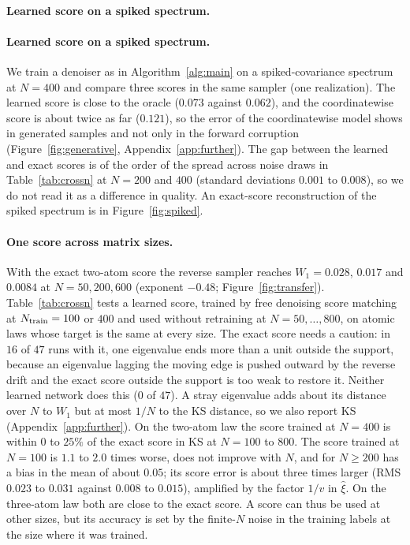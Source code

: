 \documentclass[11pt]{article}
\theoremstyle{plain}
\theoremstyle{definition}
\theoremstyle{remark}
\begin{document}
\paragraph{Learned score on a spiked spectrum.} \paragraph{Learned score on a spiked spectrum.} We train a denoiser as in Algorithm~\ref{alg:main} on a
spiked-covariance spectrum at $N=400$ and compare three scores in the same sampler
(one realization). The learned score is close to the oracle ($0.073$ against
$0.062$), and the coordinatewise score is about twice as far ($0.121$), so the error of the coordinatewise
model shows in generated samples and not only in the forward corruption (Figure~\ref{fig:generative},
Appendix~\ref{app:further}). The gap between the learned and exact scores is of the order of the spread across
noise draws in Table~\ref{tab:crossn} at $N=200$ and $400$ (standard deviations $0.001$ to $0.008$), so we do not
read it as a difference in quality. An exact-score reconstruction of the spiked spectrum is in
Figure~\ref{fig:spiked}.

\paragraph{One score across matrix sizes.} With the exact two-atom score the reverse sampler reaches $W_1=0.028$, $0.017$ and $0.0084$
at $N=50,200,600$ (exponent $-0.48$; Figure~\ref{fig:transfer}). Table~\ref{tab:crossn} tests a learned score, trained by free denoising score matching at
$N_{\rm train}=100$ or $400$ and used without retraining at $N=50,\dots,800$, on atomic laws whose target is the same at every size. The exact score
needs a caution: in $16$ of $47$ runs with it, one eigenvalue ends more than a unit outside the support, because an eigenvalue lagging the moving edge is
pushed outward by the reverse drift and the exact score outside the support is too weak to restore it. Neither learned network does this ($0$ of $47$).
A stray eigenvalue adds about its distance over $N$ to $W_1$ but at most $1/N$ to the KS distance, so we also report KS (Appendix~\ref{app:further}).
On the two-atom law the score trained at $N=400$ is within $0$ to $25\%$ of the exact score in KS at $N=100$ to $800$. The score trained at $N=100$ is
$1.1$ to $2.0$ times worse, does not improve with $N$, and for $N\ge200$ has a bias in the mean of about $0.05$; its score error is about three times larger
(RMS $0.023$ to $0.031$ against $0.008$ to $0.015$), amplified by the factor $1/v$ in $\widehat\xi$. On the three-atom law both are close to the exact score.
A score can thus be used at other sizes, but its accuracy is set by the finite-$N$ noise in the training labels at the size where it was trained.
\end{document}
